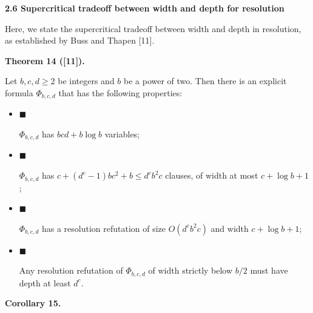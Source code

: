 \par\medskip\noindent\textbf{
2.6 Supercritical tradeoff between width and depth for resolution}\par


Here, we state the supercritical tradeoff between width and depth in resolution,
as established by Buss and Thapen [11].\par



\par\medskip\noindent\textbf{
Theorem 14 ([11]).
}\par



Let $b,c,d\geq 2$ be integers and $b$ be a power of two.
Then there is an explicit formula $\Phi_{b,c,d}$ that has the following properties:\par


\begin{itemize}


\item 
$\blacksquare$ 


$\Phi_{b,c,d}$ has $bcd+b\log b$ variables;\par





\item 
$\blacksquare$ 


$\Phi_{b,c,d}$ has $c+(d^{c}-1)bc^{2}+b\leq d^{c}b^{2}c$ clauses, of width at most $c+\log b+1$;\par





\item 
$\blacksquare$ 


$\Phi_{b,c,d}$ has a resolution refutation of size $O(d^{c}b^{2}c)$ and width $c+\log b+1$;\par





\item 
$\blacksquare$ 


Any resolution refutation of $\Phi_{b,c,d}$ of width strictly below $b/2$ must have depth at least $d^{c}$.\par





\end{itemize}




\par\medskip\noindent\textbf{
Corollary 15.
}\par



